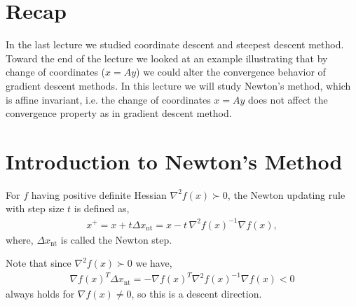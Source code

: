 \documentclass[12pt]{report}
\begin{document}

\maketitle


%

\section{Recap}
In the last lecture we studied coordinate descent and steepest descent method. Toward the end of the lecture we looked at an example illustrating that by change of coordinates ($x=Ay$) we could alter the convergence behavior of gradient descent methods. In this lecture we will study Newton's method, which is affine invariant, i.e. the change of coordinates $x=Ay$ does not affect the convergence property as in gradient descent method.

\section{Introduction to Newton's Method}
\begin{definition}
For $f$ having positive definite Hessian $\nabla ^2 f(x) \succ 0 $, the Newton updating rule with step size $t$ is defined as,
\begin{align}
x^{+} = x + t \Delta x_{\mathrm{nt}} = x - t \, \nabla^2 f(x)^{-1} \nabla f(x),
\end{align}
where, $\Delta x_{\mathrm{nt}}$ is called the Newton step. 
\end{definition}
Note that since $\nabla^2 f(x) \succ 0$ we have,
\begin{align*}
\nabla f(x)^T \Delta x_{\mathrm{nt}} =  - \nabla f(x)^T \nabla^2 f(x)^{-1} \nabla f(x) <0
\end{align*}
always holds for $\nabla f(x) \neq 0$, so this is a descent direction.
\end{document}
